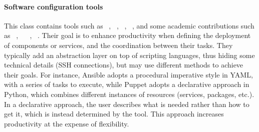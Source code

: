 \paragraph{Software configuration tools}
This class contains tools such as \ansible~\cite{ansible:web},
\puppet~\cite{puppet:web}, \chef~\cite{chef:web},
\salt~\cite{salt:web}, and some academic contributions such as
\smartfrog~\cite{10.1145/1496909.1496915},
\engage~\cite{DBLP:conf/pldi/FischerME12}
\deployware~\cite{flissi2008ccgrid},
\aeolus~\cite{dicosmo2014ic,dicosmo:hal-01233489}. Their goal is to
enhance productivity when defining the deployment of components or
services, and the coordination between their tasks. They typically add
an abstraction layer on top of scripting languages, thus hiding some
technical details (\eg SSH connections), but may use different methods
to achieve their goals. For instance, Ansible adopts a procedural
imperative style in YAML, with a series of tasks to execute, while
Puppet adopts a declarative approach in Python, which combines
different instances of resources (\ie services, packages, etc.). In a
declarative approach, the user describes what is needed rather than how
to get it, which is instead determined by the tool. This approach
increases productivity at the expense of flexibility.

